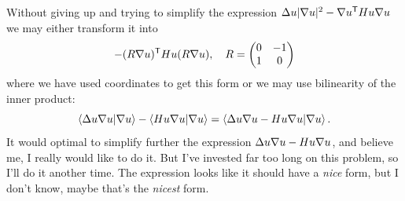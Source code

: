 \documentclass[12pt]{memoir}
\begin{document}
\begin{nonum-Rmk}
Without giving up and trying to simplify the expression $\Delta u|\nabla u|^2-\nabla u^{\mathsf{T}} Hu\nabla u$ we may either transform it into 
$$-(R\nabla u)^{\mathsf{T}} Hu(R\nabla u),\quad R=\begin{pmatrix} 0 & -1 \\ 1 & 0 \end{pmatrix}$$
where we have used coordinates to get this form or we may use bilinearity of the inner product:
$$\braket{\Delta u\nabla u}{\nabla u}-\braket{Hu\nabla u}{\nabla u}=\braket{\Delta u\nabla u-Hu\nabla u}{\nabla u}.$$
It would optimal to simplify further the expression $\Delta u\nabla u-Hu \nabla u$, and believe me, I really would like to do it. But I've invested far too long on this problem, so I'll do it another time. The expression looks like it should have a \emph{nice} form, but I don't know, maybe that's the \emph{nicest} form. 
\end{nonum-Rmk}
\end{document}
